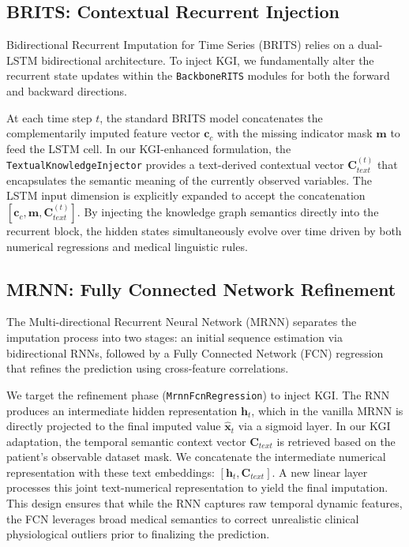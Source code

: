 \subsection{BRITS: Contextual Recurrent Injection}
Bidirectional Recurrent Imputation for Time Series (BRITS) relies on a dual-LSTM bidirectional architecture. To inject KGI, we fundamentally alter the recurrent state updates within the \texttt{BackboneRITS} modules for both the forward and backward directions.

At each time step $t$, the standard BRITS model concatenates the complementarily imputed feature vector $\mathbf{c}_c$ with the missing indicator mask $\mathbf{m}$ to feed the LSTM cell. In our KGI-enhanced formulation, the \texttt{TextualKnowledgeInjector} provides a text-derived contextual vector $\mathbf{C}_{text}^{(t)}$ that encapsulates the semantic meaning of the currently observed variables. The LSTM input dimension is explicitly expanded to accept the concatenation $[\mathbf{c}_c, \mathbf{m}, \mathbf{C}_{text}^{(t)}]$. By injecting the knowledge graph semantics directly into the recurrent block, the hidden states simultaneously evolve over time driven by both numerical regressions and medical linguistic rules.

\subsection{MRNN: Fully Connected Network Refinement}
The Multi-directional Recurrent Neural Network (MRNN) separates the imputation process into two stages: an initial sequence estimation via bidirectional RNNs, followed by a Fully Connected Network (FCN) regression that refines the prediction using cross-feature correlations.

We target the refinement phase (\texttt{MrnnFcnRegression}) to inject KGI. The RNN produces an intermediate hidden representation $\mathbf{h}_t$, which in the vanilla MRNN is directly projected to the final imputed value $\mathbf{\hat{x}}_t$ via a sigmoid layer. In our KGI adaptation, the temporal semantic context vector $\mathbf{C}_{text}$ is retrieved based on the patient's observable dataset mask. We concatenate the intermediate numerical representation with these text embeddings: $[\mathbf{h}_t, \mathbf{C}_{text}]$. A new linear layer processes this joint text-numerical representation to yield the final imputation. This design ensures that while the RNN captures raw temporal dynamic features, the FCN leverages broad medical semantics to correct unrealistic clinical physiological outliers prior to finalizing the prediction.

